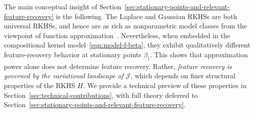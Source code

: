 \documentclass[sn-mathphys-num]{sn-jnl}%
\numberwithin{equation}{section}
\newcommand{\redblock}[1]{{\color{black}#1}}
\newcommand{\E}{\mathbb{E}}
\theoremstyle{thmstyleone}%
\theoremstyle{thmstyletwo}%
\theoremstyle{thmstylethree}%
\begin{document}
\redblock{
The main conceptual insight of Section~\ref{sec:stationary-points-and-relevant-feature-recovery} is the following. The Laplace and Gaussian RKHSs are both universal RKHSs, and hence are as rich as nonparametric model classes from the viewpoint of function approximation~\cite{SriperumbudurFuLa11}. Nevertheless, when embedded in the compositional kernel model~\eqref{eqn:model-f-beta}, they exhibit qualitatively different feature-recovery behavior at stationary points $\beta_\dagger$. This shows that approximation power alone does not determine feature recovery. Rather, \emph{feature recovery is governed by the variational landscape of $\mathcal J$}, which depends on finer structural properties of the RKHS $H$. We provide a technical preview of these properties in Section~\ref{sec:technical-contributions}, with full theory deferred to Section~\ref{sec:stationary-points-and-relevant-feature-recovery}.
}

%
\end{document}
